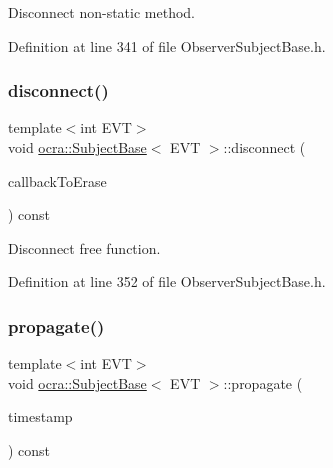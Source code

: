 Disconnect non-\/static method. 



Definition at line 341 of file Observer\+Subject\+Base.\+h.

\hypertarget{classocra_1_1SubjectBase_a58cd908830894df5c5cc6d03888ae8cc}{}\label{classocra_1_1SubjectBase_a58cd908830894df5c5cc6d03888ae8cc} 
\subsubsection{\texorpdfstring{disconnect()}{disconnect()}\hspace{0.1cm}{\footnotesize\ttfamily [2/2]}}
{\footnotesize\ttfamily template$<$int E\+VT$>$ \\
void \hyperlink{classocra_1_1SubjectBase}{ocra\+::\+Subject\+Base}$<$ E\+VT $>$\+::disconnect (\begin{DoxyParamCaption}\item[{typename \hyperlink{structocra_1_1SubjectBaseTraits}{Subject\+Base\+Traits}$<$ E\+VT, void $>$\+::callback\+\_\+type}]{callback\+To\+Erase }\end{DoxyParamCaption}) const\hspace{0.3cm}{\ttfamily [inline]}}



Disconnect free function. 



Definition at line 352 of file Observer\+Subject\+Base.\+h.

\hypertarget{classocra_1_1SubjectBase_aed2d8628df9c04ae95ce8ca68ff75819}{}\label{classocra_1_1SubjectBase_aed2d8628df9c04ae95ce8ca68ff75819} 
\subsubsection{\texorpdfstring{propagate()}{propagate()}\hspace{0.1cm}{\footnotesize\ttfamily [1/2]}}
{\footnotesize\ttfamily template$<$int E\+VT$>$ \\
void \hyperlink{classocra_1_1SubjectBase}{ocra\+::\+Subject\+Base}$<$ E\+VT $>$\+::propagate (\begin{DoxyParamCaption}\item[{int}]{timestamp }\end{DoxyParamCaption}) const\hspace{0.3cm}{\ttfamily [inline]}}

